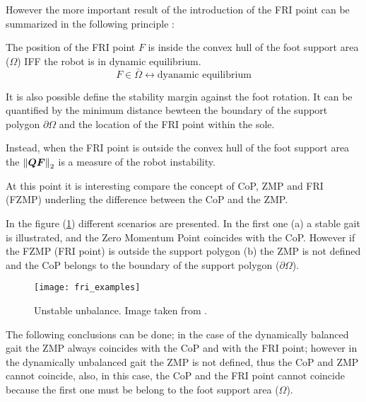 However the more important result of the introduction of the FRI point can be summarized in the
following principle \cite{Goswami1999}:
\begin{principle}
  The position of the FRI point $F$ is inside the convex hull of the foot support area ($\Omega$)
  IFF the robot is in dynamic equilibrium.
  \[
  F \in \bar{\Omega} \longleftrightarrow \text{dyanamic equilibrium}
  \]
  \par
  It is also possible define the stability margin against the foot rotation.
  It can be  quantified by the minimum distance bewteen the boundary of the support polygon
  $\partial \Omega$ and the location of the FRI point within the sole.
  \par
  Instead, when the FRI point is outside the convex hull of the foot support area the
  $\left\lVert\boldsymbol{QF}\right\rVert_2$ is a measure of the robot instability.
\end{principle}
At this point it is interesting compare the concept of CoP, ZMP and FRI (FZMP)
underling the difference between the CoP and the ZMP.
\par
In the figure (\ref{fig:fri_example}) different scenarios are presented. In the first one (a) a
stable gait is illustrated, and the Zero Momentum Point coincides with the CoP. However if
the FZMP (FRI point) is outside the support polygon (b) the ZMP is not defined and the CoP belongs
to the boundary of the support polygon ($\partial \Omega$).
\begin{figure}[!ht]
  \centering
  \texttt{[image: fri\_examples]}
  \caption{Unstable unbalance. Image taken from \cite{Vukobratov2004}. \label{fig:fri_example}}
\end{figure}
The following conclusions can be done; in the case of the dynamically balanced gait the ZMP always
coincides with the CoP and with the FRI point;
however in the dynamically unbalanced gait  the ZMP is not defined, thus the CoP and
ZMP cannot coincide, also, in this case, the CoP and the FRI point cannot coincide because the
first one must be belong to the foot support area ($\Omega$).
\newpage
